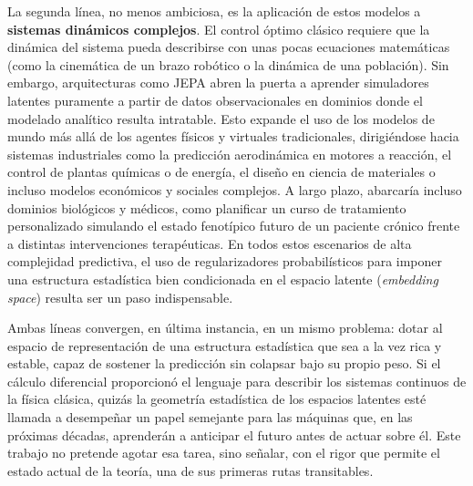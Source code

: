 La segunda línea, no menos ambiciosa, es la aplicación de estos modelos a \textbf{sistemas dinámicos complejos}. El control óptimo clásico requiere que la dinámica del sistema pueda describirse con unas pocas ecuaciones matemáticas (como la cinemática de un brazo robótico o la dinámica de una población). Sin embargo, arquitecturas como JEPA abren la puerta a aprender simuladores latentes puramente a partir de datos observacionales en dominios donde el modelado analítico resulta intratable. Esto expande el uso de los modelos de mundo más allá de los agentes físicos y virtuales tradicionales, dirigiéndose hacia sistemas industriales como la predicción aerodinámica en motores a reacción, el control de plantas químicas o de energía, el diseño en ciencia de materiales o incluso modelos económicos y sociales complejos. A largo plazo, abarcaría incluso dominios biológicos y médicos, como planificar un curso de tratamiento personalizado simulando el estado fenotípico futuro de un paciente crónico frente a distintas intervenciones terapéuticas. En todos estos escenarios de alta complejidad predictiva, el uso de regularizadores probabilísticos para imponer una estructura estadística bien condicionada en el espacio latente (\emph{embedding space}) resulta ser un paso indispensable.

Ambas líneas convergen, en última instancia, en un mismo problema: dotar al espacio de representación de una estructura estadística que sea a la vez rica y estable, capaz de sostener la predicción sin colapsar bajo su propio peso. Si el cálculo diferencial proporcionó el lenguaje para describir los sistemas continuos de la física clásica, quizás la geometría estadística de los espacios latentes esté llamada a desempeñar un papel semejante para las máquinas que, en las próximas décadas, aprenderán a anticipar el futuro antes de actuar sobre él. Este trabajo no pretende agotar esa tarea, sino señalar, con el rigor que permite el estado actual de la teoría, una de sus primeras rutas transitables.
